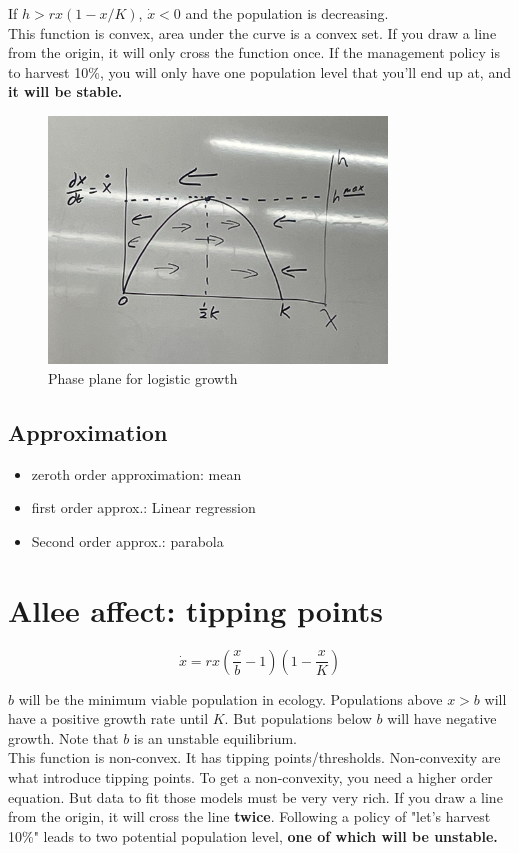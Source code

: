 \documentclass{article}
\begin{document}
If $h > rx(1-x/K)$, $\dot x <0$ and the population is decreasing. \\

This function is convex, area under the curve is a convex set. If you draw a line from the origin, it will only cross the function once. If the management policy is to harvest 10\%, you will only have one population level that you'll end up at, and \textbf{it will be stable.}

\begin{figure}[htp]
    \centering
    \includegraphics[width=9cm]{phase_plane.png}
    \caption{Phase plane for logistic growth}
\end{figure}


\subsection{Approximation}
\begin{itemize}
    \item zeroth order approximation: mean
    \item first order approx.: Linear regression
    \item Second order approx.: parabola 
\end{itemize}

\section{Allee affect: tipping points} 
$$\dot x = rx(\frac{x}{b} - 1)(1-\frac{x}{K})$$

$b$ will be the minimum viable population in ecology. Populations above $x > b$ will have a positive growth rate until $K$. But populations below $b$ will have negative growth. Note that $b$ is an unstable equilibrium. \\

This function is non-convex. It has tipping points/thresholds. Non-convexity are what introduce tipping points. To get a non-convexity, you need a higher order equation. But data to fit those models must be very very rich. If you draw a line from the origin, it will cross the line \textbf{twice}. Following a policy of "let's harvest 10\%" leads to two potential population level, \textbf{one of which will be unstable. }
\end{document}
